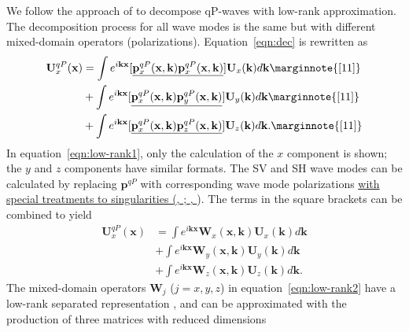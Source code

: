 \documentclass[manuscript,ulem,graphix,revised]{geophysics}
\begin{document}
We follow the approach of \citet{cheng14} to decompose qP-waves with low-rank approximation.
The decomposition process for all wave modes is the same but with different mixed-domain operators (polarizations).
Equation~\ref{eqn:dec} is rewritten as
\begin{equation}
\begin{split}
\mathbf{U}^{qP}_x(\mathbf{x})&=\int e^{i\mathbf{kx}}[\uline{\mathbf{p}^{qP}_{x}(\mathbf{x,k})\mathbf{p}^{qP}_{x}(\mathbf{x,k})}]\mathbf{U}_x(\mathbf{k})d\mathbf{k} \marginnote{[11]}\\
                    &+\int e^{i\mathbf{kx}}[\uline{\mathbf{p}^{qP}_{x}(\mathbf{x,k})\mathbf{p}^{qP}_{y}(\mathbf{x,k})}]\mathbf{U}_y(\mathbf{k})d\mathbf{k} \marginnote{[11]}\\
                    &+\int e^{i\mathbf{kx}}[\uline{\mathbf{p}^{qP}_{x}(\mathbf{x,k})\mathbf{p}^{qP}_{z}(\mathbf{x,k})}]\mathbf{U}_z(\mathbf{k})d\mathbf{k}. \marginnote{[11]}
\end{split}
\label{eqn:low-rank1}
\end{equation}
In equation~\ref{eqn:low-rank1}, only the calculation of the $x$ component is shown; the $y$ and $z$ components have similar formats. The SV and SH wave modes can be calculated by replacing \marginnote{[11, 20, 21, 30, 31, 32, 36, 40]} \uline{$\mathbf{p}^{qP}$} with corresponding wave mode polarizations \uline{with special treatments to singularities 
(\mbox{\citeauthor{cheng14}}, \mbox{\citeyear{cheng14}}; \mbox{\citeauthor{Sripanich16}}, \mbox{\citeyear{Sripanich16}}}). 
The terms in the square brackets can be combined to yield
\begin{equation}
\begin{split}
\mathbf{U}^{qP}_x(\mathbf{x})&=\int e^{i\mathbf{kx}}\mathbf{W}_x(\mathbf{x,k})\mathbf{U}_x(\mathbf{k})d\mathbf{k} \\
                    &+\int e^{i\mathbf{kx}}\mathbf{W}_y(\mathbf{x,k})\mathbf{U}_y(\mathbf{k})d\mathbf{k}\\
                    &+\int e^{i\mathbf{kx}}\mathbf{W}_z(\mathbf{x,k})\mathbf{U}_z(\mathbf{k})d\mathbf{k}. 
\end{split}
\label{eqn:low-rank2}
\end{equation}
The mixed-domain operators $\mathbf{W}_j$ ($j=x,y,z$) in equation~\ref{eqn:low-rank2} have a low-rank separated representation \citep{fomel13}, and can be approximated with the production of three matrices with reduced dimensions 
\end{document}
